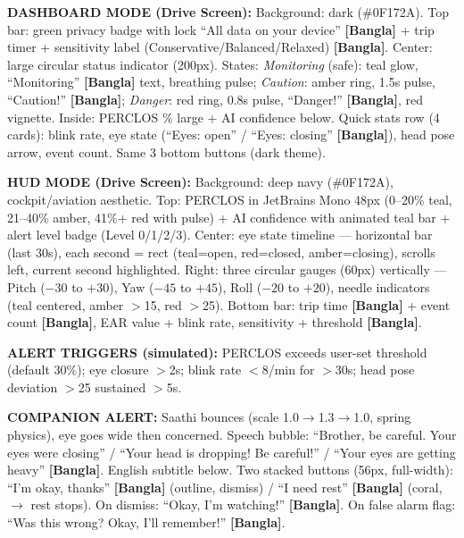 \documentclass[sigconf]{acmart}
\begin{document}
 
\begin{promptbox}
\textbf{DASHBOARD MODE (Drive Screen):} Background: dark (\#0F172A). Top bar: green privacy badge with lock ``All data on your device'' \textbf{[Bangla]} + trip timer + sensitivity label (Conservative/Balanced/Relaxed) \textbf{[Bangla]}. Center: large circular status indicator (200px). States: \textit{Monitoring} (safe): teal glow, ``Monitoring'' \textbf{[Bangla]} text, breathing pulse; \textit{Caution}: amber ring, 1.5s pulse, ``Caution!'' \textbf{[Bangla]}; \textit{Danger}: red ring, 0.8s pulse, ``Danger!'' \textbf{[Bangla]}, red vignette. Inside: PERCLOS \% large + AI confidence below. Quick stats row (4 cards): blink rate, eye state (``Eyes: open'' / ``Eyes: closing'' \textbf{[Bangla]}), head pose arrow, event count. Same 3 bottom buttons (dark theme).
 
\textbf{HUD MODE (Drive Screen):} Background: deep navy (\#0F172A), cockpit/aviation aesthetic. Top: PERCLOS in JetBrains Mono 48px (0--20\% teal, 21--40\% amber, 41\%+ red with pulse) + AI confidence with animated teal bar + alert level badge (Level 0/1/2/3). Center: eye state timeline --- horizontal bar (last 30s), each second = rect (teal=open, red=closed, amber=closing), scrolls left, current second highlighted. Right: three circular gauges (60px) vertically --- Pitch ($-30$\textdegree{} to $+30$\textdegree), Yaw ($-45$\textdegree{} to $+45$\textdegree), Roll ($-20$\textdegree{} to $+20$\textdegree), needle indicators (teal centered, amber $>$15\textdegree, red $>$25\textdegree). Bottom bar: trip time \textbf{[Bangla]} + event count \textbf{[Bangla]}, EAR value + blink rate, sensitivity + threshold \textbf{[Bangla]}.
 
\textbf{ALERT TRIGGERS (simulated):} PERCLOS exceeds user-set threshold (default 30\%); eye closure $>$2s; blink rate $<$8/min for $>$30s; head pose deviation $>$25\textdegree{} sustained $>$5s.
 
\textbf{COMPANION ALERT:} Saathi bounces (scale 1.0$\rightarrow$1.3$\rightarrow$1.0, spring physics), eye goes wide then concerned. Speech bubble: ``Brother, be careful. Your eyes were closing'' / ``Your head is dropping! Be careful!'' / ``Your eyes are getting heavy'' \textbf{[Bangla]}. English subtitle below. Two stacked buttons (56px, full-width): ``I'm okay, thanks'' \textbf{[Bangla]} (outline, dismiss) / ``I need rest'' \textbf{[Bangla]} (coral, $\rightarrow$ rest stops). On dismiss: ``Okay, I'm watching!'' \textbf{[Bangla]}. On false alarm flag: ``Was this wrong? Okay, I'll remember!'' \textbf{[Bangla]}.
 

\end{promptbox}
\end{document}
